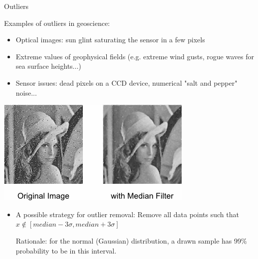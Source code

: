 \documentclass{beamer}
\begin{document}
\begin{frame}{Outliers}
\begin{block}{Examples of outliers in geoscience:}
\begin{itemize}
\item Optical images: sun glint saturating the sensor in a few pixels
\item Extreme values of geophysical fields (e.g. extreme wind gusts, rogue waves for sea surface heights...)
\item Sensor issues: dead pixels on a CCD device, numerical "salt and pepper" noise...
\end{itemize}
\end{block}


\begin{center}
\includegraphics[scale=0.45]{midF.png}
\end{center}

\begin{itemize}
\item A possible strategy for outlier removal: Remove all data points such that $x \notin [median - 3\sigma, median + 3\sigma]$

Rationale: for the normal (Gaussian) distribution, a drawn sample has 99\% probability to be in this interval.
\end{itemize}

\end{frame}
\end{document}
